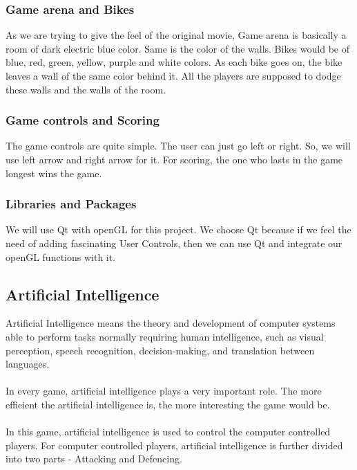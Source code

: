 \documentclass[14 pt]{article}
\begin{document}
\subsubsection{Game arena and Bikes}
    As we are trying to give the feel of the original movie, Game arena is basically a room of dark electric blue color. Same is the color of the walls. Bikes would be of blue, red, green, yellow, purple and white colors. As each bike goes on, the bike leaves a wall of the same color behind it. All the players are supposed to dodge these walls and the walls of the room.\\
    
\subsubsection{Game controls and Scoring}
    The game controls are quite simple. The user can just go left or right. So, we will use left arrow and right arrow for it. For scoring, the one who lasts in the game longest wins the game.\\
    
\subsubsection{Libraries and Packages}
    We will use Qt with openGL for this project. We choose Qt because if we feel the need of adding fascinating User Controls, then we can use Qt and integrate our openGL functions with it.\\
    
    
\subsection{Artificial Intelligence}
    Artificial Intelligence means the theory and development of computer systems able to perform tasks normally requiring human intelligence, such as visual perception, speech recognition, decision-making, and translation between languages.\\\\
    In every game, artificial intelligence plays a very important role. The more efficient the artificial intelligence is, the more interesting the game would be.\\\\
    In this game, artificial intelligence is used to control the computer controlled players. For computer controlled players, artificial intelligence is further divided into two parts - Attacking and Defencing.
\end{document}

